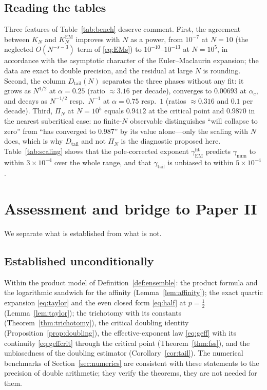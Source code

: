 \documentclass[11pt,reqno]{amsart}
\theoremstyle{plain}
\theoremstyle{definition}
\theoremstyle{remark}
\numberwithin{equation}{section}
\newcommand{\Dtail}{D_{\mathrm{tail}}}
\newcommand{\gEM}{\gamma_{\mathrm{EM}}}
\newcommand{\gnum}{\gamma_{\mathrm{num}}}
\newcommand{\gtail}{\gamma_{\mathrm{tail}}}
\begin{document}
\subsection*{Reading the tables}
Three features of Table~\ref{tab:bench} deserve comment. First, the agreement between $K_N$ and $K_N^{\mathrm{EM}}$ improves with $N$ as a power, from $10^{-7}$ at $N=10$ (the neglected $O(N^{-s-3})$ term of \eqref{eq:EMs}) to $10^{-10}$--$10^{-13}$ at $N=10^5$, in accordance with the asymptotic character of the Euler--Maclaurin expansion; the data are exact to double precision, and the residual at large $N$ is rounding. Second, the column $\Dtail(N)$ separates the three phases without any fit: it grows as $N^{1/2}$ at $\alpha=0.25$ (ratio $\approx3.16$ per decade), converges to $0.00693$ at $\alpha_c$, and decays as $N^{-1/2}$ resp.\ $N^{-1}$ at $\alpha=0.75$ resp.\ $1$ (ratios $\approx0.316$ and $0.1$ per decade). Third, $\Pi_N$ at $N=10^5$ equals $0.9412$ at the critical point and $0.9870$ in the nearest subcritical case: no finite-$N$ observable distinguishes ``will collapse to zero'' from ``has converged to $0.987$'' by its value alone---only the scaling with $N$ does, which is why $\Dtail$ and not $\Pi_N$ is the diagnostic proposed here. Table~\ref{tab:scaling} shows that the pole-corrected exponent $\gEM^{\mathrm{fit}}$ predicts $\gnum$ to within $3\times10^{-4}$ over the whole range, and that $\gtail$ is unbiased to within $5\times10^{-4}$.

\clearpage
\section{Assessment and bridge to Paper II}
\label{sec:assessment}

We separate what is established from what is not.

\subsection*{Established unconditionally}
Within the product model of Definition~\ref{def:ensemble}: the product formula and the logarithmic sandwich for the affinity (Lemma~\ref{lem:affinity}); the exact quartic expansion \eqref{eq:taylor} and the even closed form \eqref{eq:half} at $p=\frac12$ (Lemma~\ref{lem:taylor}); the trichotomy with its constants (Theorem~\ref{thm:trichotomy}), the critical doubling identity (Proposition~\ref{prop:doubling}), the effective-exponent law \eqref{eq:geff} with its continuity \eqref{eq:geffcrit} through the critical point (Theorem~\ref{thm:fss}), and the unbiasedness of the doubling estimator (Corollary~\ref{cor:tail}). The numerical benchmarks of Section~\ref{sec:numerics} are consistent with these statements to the precision of double arithmetic; they verify the theorems, they are not needed for them.
\end{document}
